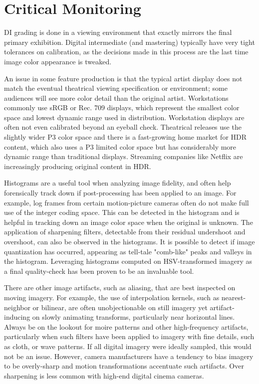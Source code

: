 \section{Critical Monitoring}%
\label{sec:critical-monitoring}

DI grading is done in a viewing environment that exactly mirrors the final primary exhibition. Digital intermediate (and mastering) typically have very tight tolerances on calibration, as the decisions made in this process are the last time image color appearance is tweaked.

An issue in some feature production is that the typical artist display does not match the eventual theatrical viewing specification or environment; some audiences will see more color detail than the original artist. Workstations commonly use sRGB or Rec. 709 displays, which represent the smallest color space and lowest dynamic range used in distribution. Workstation displays are often not even calibrated beyond an eyeball check. Theatrical releases use the slightly wider P3 color space and there is a fast-growing home market for HDR content, which also uses a P3 limited color space but has considerably more dynamic range than traditional displays. Streaming companies like Netflix are increasingly producing original content in HDR.

Histograms are a useful tool when analyzing image fidelity, and often help forensically track down if post-processing has been applied to an image. For example, log frames from certain motion-picture cameras often do not make full use of the integer coding space. This can be detected in the histogram and is helpful in tracking down an image color space when the original is unknown. The application of sharpening filters, detectable from their residual undershoot and overshoot, can also be observed in the histograms. It is possible to detect if image quantization has occurred, appearing as tell-tale "comb-like" peaks and valleys in the histogram. Leveraging histograms computed on HSV-transformed imagery as a final quality-check has been proven to be an invaluable tool.

There are other image artifacts, such as aliasing, that are best inspected on moving imagery. For example, the use of interpolation kernels, such as nearest-neighbor or bilinear, are often unobjectionable on still imagery yet artifact-inducing on slowly animating transforms, particularly near horizontal lines. Always be on the lookout for moire patterns and other high-frequency artifacts, particularly when such filters have been applied to imagery with fine details, such as cloth, or wave patterns. If all digital imagery were ideally sampled, this would not be an issue. However, camera manufacturers have a tendency to bias imagery to be overly-sharp and motion transformations accentuate such artifacts. Over sharpening is less common with high-end digital cinema cameras.

